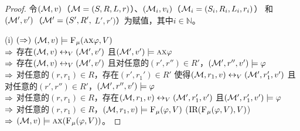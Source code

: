 \begin{proof}
	令$({\cal M},v)$（${\cal M}=(S,R, L, r)$）、$({\cal M}_i, v_i)$（${\cal M}_i = (S_i, R_i, L_i, r_i)$） 和$({\cal M}',v')$（${\cal M}'=(S', R',$ $L', r')$）为赋值，其中$i\in \mathbb{N}$。
	
	(i) 
	$(\Rightarrow)$ $({\cal M},v) \models {\textsc{F}_{\textsc{$\mu$}}}(\textsc{a}\textsc{x} \varphi, V)$\\
	$\Rightarrow$ 存在$({\cal M},v) \leftrightarrow_V ({\cal M}', v')$ 且$({\cal M}', v') \models \textsc{a}\textsc{x} \varphi$\\
	$\Rightarrow$ 存在$({\cal M},v) \leftrightarrow_V ({\cal M}', v')$ 且对任意的$(r', r'') \in R'$，$({\cal M}',r'', v') \models \varphi$\\
	$\Rightarrow$ 对任意的$(r,r_1)\in R$，存在$(r', r_1') \in R'$ 使得$({\cal M},r_1, v) \leftrightarrow_V ({\cal M}',r_1',v')$ 且对任意的$(r', r'') \in R'$，$({\cal M}',r'', v') \models \varphi$\\
	$\Rightarrow$ 对任意的$(r,r_1)\in R$，存在$({\cal M},r_1, v) \leftrightarrow_V ({\cal M}',r_1',v')$ 且$({\cal M}',r_1',v') \models \varphi$\\
	$\Rightarrow$ 对任意的$(r,r_1)\in R$，$({\cal M},r_1, v) \models {\textsc{F}_{\textsc{$\mu$}}}(\varphi,V)$ \hfill ($\textrm{IR}({\textsc{F}_{\textsc{$\mu$}}}(\varphi,V), V)$)\\
	$\Rightarrow$ $({\cal M},v)\models \textsc{a} \textsc{x} ({\textsc{F}_{\textsc{$\mu$}}}(\varphi,V))$。
	

\end{proof}
